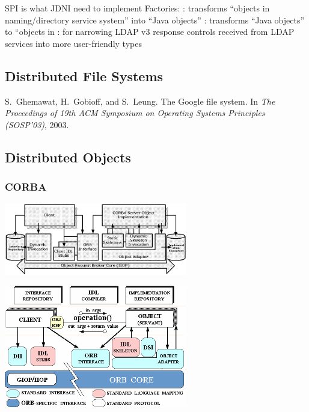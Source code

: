 \documentclass{myproc}
\begin{document}
\w {}
\bit
\w SPI is what JDNI  need to implement
\w Factories:
  \bit
  \w {}: transforms ``objects in naming/directory service
  system'' into ``Java objects''
  \w {}: transforms ``Java objects'' to ``objects in
  \w {}: for narrowing LDAP v3 response controls
  received from LDAP services into more user-friendly types
  \eit
\eit
\eit

\subsection{Distributed File Systems}
\bit
\w S.~Ghemawat, H.~Gobioff, and S.~Leung.
\newblock The Google file system.
\newblock In {\em The Proceedings of 19th ACM Symposium on Operating Systems
  Principles (SOSP'03)}, 2003.
\eit

\subsection{Distributed Objects}
\subsubsection{CORBA}
\bit
\w {}
\begin{center}
\centerline{\includegraphics[width=8cm]{pics/corba-01}}
\end{center}

\w {}
\begin{center}
\centerline{\includegraphics[width=8cm]{pics/corba-02}}
\end{center}
\end{document}
